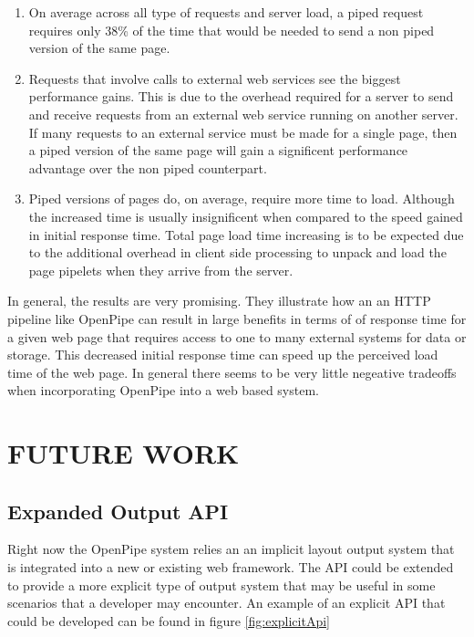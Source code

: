 \documentclass[12pt]{report}
\begin{document}
\begin{enumerate}
\item On average across all type of requests and server load, a piped request requires only 38\% of the time that would be needed to send a non piped version of the same page.
\item Requests that involve calls to external web services see the biggest performance gains. This is due to the overhead required for a server to send and receive requests from an external web service running on another server. If many requests to an external service must be made for a single page, then a piped version of the same page will gain a significent performance advantage over the non piped counterpart.
\item Piped versions of pages do, on average, require more time to load. Although the increased time is usually insignificent when compared to the speed gained in initial response time. Total page load time increasing is to be expected due to the additional overhead in client side processing to unpack and load the page pipelets when they arrive from the server. 
\end{enumerate}

In general, the results are very promising.  They illustrate how an an HTTP pipeline like OpenPipe can result in large benefits in terms of of response time for a given web page that requires access to one to many external systems for data or storage. This decreased initial response time can speed up the perceived load time of the web page. In general there seems to be very little negeative tradeoffs when incorporating OpenPipe into a web based system.

\chapter{FUTURE WORK}

\section{Expanded Output API}
Right now the OpenPipe system relies an an implicit layout output system that is integrated into a new or existing web framework. The API could be extended to provide a more explicit type of output system that may be useful in some scenarios that a developer may encounter. An example of an explicit API that could  be developed can be found in figure \ref{fig:explicitApi}
\end{document}
